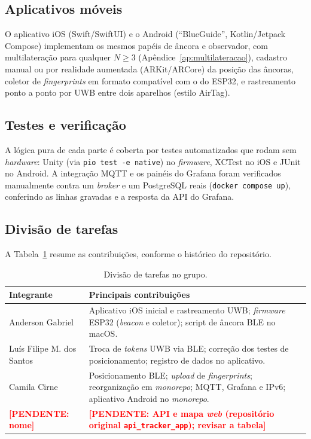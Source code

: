 \documentclass[12pt]{article}
\newcommand{\pendente}[1]{\textcolor{red}{\textbf{[PENDENTE: #1]}}}
\begin{document}
\subsection{Aplicativos móveis}
O aplicativo iOS (Swift/SwiftUI) e o Android (``BlueGuide'', Kotlin/Jetpack Compose) implementam
os mesmos papéis de âncora e observador, com multilateração para qualquer $N \geq 3$
(Apêndice~\ref{ap:multilateracao}), cadastro manual ou por realidade aumentada (ARKit/ARCore) da
posição das âncoras, coletor de \textit{fingerprints} em formato compatível com o do ESP32, e
rastreamento ponto a ponto por UWB entre dois aparelhos (estilo AirTag).

\subsection{Testes e verificação}
A lógica pura de cada parte é coberta por testes automatizados que rodam sem \textit{hardware}:
Unity (via \texttt{pio test -e native}) no \textit{firmware}, XCTest no iOS e JUnit no Android.
A integração MQTT e os painéis do Grafana foram verificados manualmente contra um \textit{broker}
e um PostgreSQL reais (\texttt{docker compose up}), conferindo as linhas gravadas e a resposta da
API do Grafana.

\subsection{Divisão de tarefas}
A Tabela~\ref{tab:tarefas} resume as contribuições, conforme o histórico do repositório.

\begin{table}[htb]
\centering
\caption{Divisão de tarefas no grupo.}
\label{tab:tarefas}
\small
\begin{tabularx}{\textwidth}{>{\raggedright\arraybackslash}p{3.6cm} X}
\toprule
\textbf{Integrante} & \textbf{Principais contribuições} \\
\midrule
Anderson Gabriel & Aplicativo iOS inicial e rastreamento UWB; \textit{firmware} ESP32
  (\textit{beacon} e coletor); script de âncora BLE no macOS. \\
Luís Filipe M. dos Santos & Troca de \textit{tokens} UWB via BLE; correção dos testes de
  posicionamento; registro de dados no aplicativo. \\
Camila Cirne & Posicionamento BLE; \textit{upload} de \textit{fingerprints}; reorganização em
  \textit{monorepo}; MQTT, Grafana e IPv6; aplicativo Android no \textit{monorepo}. \\
\pendente{nome} & \pendente{API e mapa \textit{web} (repositório original \texttt{api\_tracker\_app}); revisar a tabela} \\
\bottomrule
\end{tabularx}
\end{table}
\end{document}
